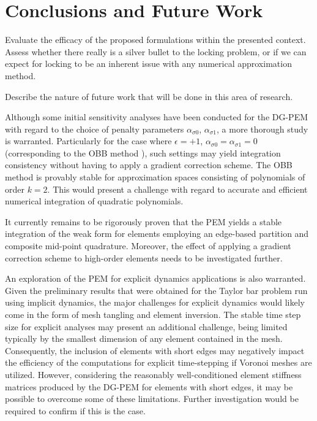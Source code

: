 \chapter{Conclusions and Future Work} \label{ch:future_work}
%
Evaluate the efficacy of the proposed formulations within the presented context. Assess whether there really is a silver bullet to the locking problem, or if we can expect for locking to be an inherent issue with any numerical approximation method.

Describe the nature of future work that will be done in this area of research.

Although some initial sensitivity analyses have been conducted for the DG-PEM with regard to the choice of penalty parameters $\alpha_{\sigma0}$, $\alpha_{\sigma1}$, a more thorough study is warranted. Particularly for the case where $\epsilon = +1$, $\alpha_{\sigma0} = \alpha_{\sigma1} = 0$ (corresponding to the OBB method \cite{Oden:98}), such settings may yield integration consistency without having to apply a gradient correction scheme. The OBB method is provably stable for approximation spaces consisting of polynomials of order $k=2$. This would present a challenge with regard to accurate and efficient numerical integration of quadratic polynomials.

It currently remains to be rigorously proven that the PEM yields a stable integration of the weak form for elements employing an edge-based partition and composite mid-point quadrature. Moreover, the effect of applying a gradient correction scheme to high-order elements needs to be investigated further.

An exploration of the PEM for explicit dynamics applications is also warranted. Given the preliminary results that were obtained for the Taylor bar problem run using implicit dynamics, the major challenges for explicit dynamics would likely come in the form of mesh tangling and element inversion. The stable time step size for explicit analyses may present an additional challenge, being limited typically by the smallest dimension of any element contained in the mesh. Consequently, the inclusion of elements with short edges may negatively impact the efficiency of the computations for explicit time-stepping if Voronoi meshes are utilized. However, considering the reasonably well-conditioned element stiffness matrices produced by the DG-PEM for elements with short edges, it may be possible to overcome some of these limitations. Further investigation would be required to confirm if this is the case. 


